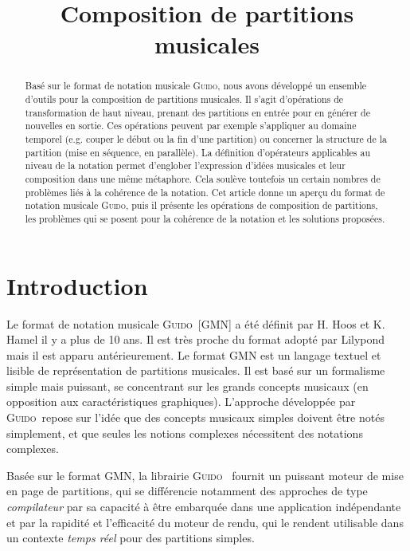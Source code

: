 \documentclass{article}
\title{Composition de partitions musicales}
\newcommand{\Guido}		{\textsc{Guido}}
\begin{document}
%
\maketitle
%
\begin{abstract}
Basé sur le format de notation musicale \Guido , nous avons développé un ensemble d'outils pour la composition de partitions musicales. Il s'agit d'opérations de transformation de haut niveau, prenant des partitions en entrée pour en générer de nouvelles  en sortie. Ces opérations peuvent par exemple s'appliquer au domaine temporel (e.g. couper le début ou la fin d'une partition) ou concerner la structure de la partition (mise en séquence, en parallèle).
La définition d'opérateurs applicables au niveau de la notation permet d'englober l'expression d'idées musicales et leur composition dans une même métaphore. Cela soulève toutefois un certain nombres de problèmes liés à la cohérence de la notation.
Cet article donne un aperçu du format de notation musicale \Guido , puis il présente les opérations de composition de partitions, les problèmes qui se posent pour la cohérence de la notation et les solutions proposées.
\end{abstract}

\section{Introduction}\label{sec:intro}
Le format de notation musicale \Guido\ [GMN] \cite{hoos98} \cite{guido} a été définit par H. Hoos et K. Hamel il y a plus de 10 ans.
Il est très proche du format adopté par Lilypond \cite{lilypond03} \cite{lilypond06} mais il est apparu antérieurement.
Le format GMN est un langage textuel et lisible de représentation de partitions musicales. Il est basé sur un formalisme simple mais puissant, se concentrant sur les grands concepts musicaux (en opposition aux caractéristiques graphiques). L'approche développée par \Guido\ repose sur l'idée que des concepts musicaux simples doivent être notés simplement, et que seules les notions complexes nécessitent des notations complexes.

Basée sur le format GMN, la librairie \Guido\ \cite{daudin09a,Fober:04b} fournit un puissant moteur de mise en page de partitions, qui se différencie notamment des approches de type \emph{compilateur}  \cite{lilypond03,musixtex} par sa capacité à être embarquée dans une application indépendante et par la rapidité et l'efficacité du moteur de rendu, qui le rendent utilisable dans un contexte \emph{temps réel} pour des partitions simples.
\end{document}

